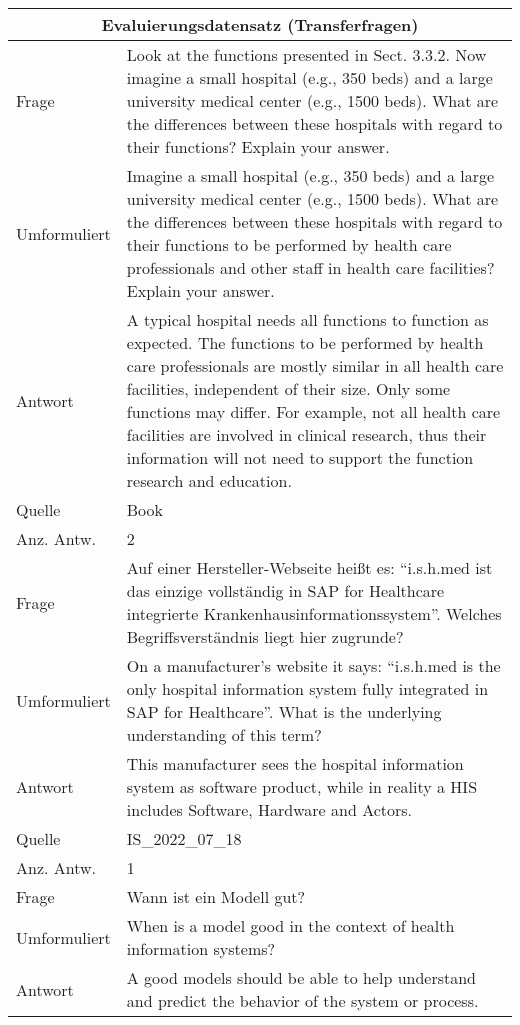 \begin{landscape}
    \begin{longtable}{p{3cm}p{}}
    \toprule
    \multicolumn{2}{c}{\textbf{Evaluierungsdatensatz (Transferfragen)}}\\
    \midrule
    Frage & Look at the functions presented in Sect. 3.3.2. Now imagine a small hospital (e.g., 350 beds) and a large university medical center (e.g., 1500 beds). What are the differences between these hospitals with regard to their functions? Explain your answer.\\
    Umformuliert & Imagine a small hospital (e.g., 350 beds) and a large university medical center (e.g., 1500 beds). What are the differences between these hospitals with regard to their functions to be performed by health care professionals and other staff in health care facilities? Explain your answer.\\
    Antwort & A typical hospital needs all functions to function as expected.
    The functions to be performed by health care professionals are mostly similar in all health care facilities, independent of their size.
    Only some functions may differ.
    For example, not all health care facilities are involved in clinical research, thus their information will not need to support the function research and education.\\
    Quelle & Book \\
    Anz. Antw. & 2 \\
    \midrule
    Frage & Auf einer Hersteller-Webseite heißt es: ``i.s.h.med ist das einzige vollständig in SAP for Healthcare integrierte Krankenhausinformationssystem''. Welches Begriffsverständnis liegt hier zugrunde? \\
    Umformuliert & On a manufacturer's website it says: ``i.s.h.med is the only hospital information system fully integrated in SAP for Healthcare''. What is the underlying understanding of this term? \\
    Antwort & This manufacturer sees the hospital information system as software product, while in reality a HIS includes Software, Hardware and Actors.\\
    Quelle & IS\_2022\_07\_18 \\
    Anz. Antw. & 1 \\
    \midrule
    Frage & Wann ist ein Modell gut? \\
    Umformuliert & When is a model good in the context of health information systems? \\
    Antwort & A good models should be able to help understand and predict the behavior of the system or process.

\end{longtable}
\end{landscape}
